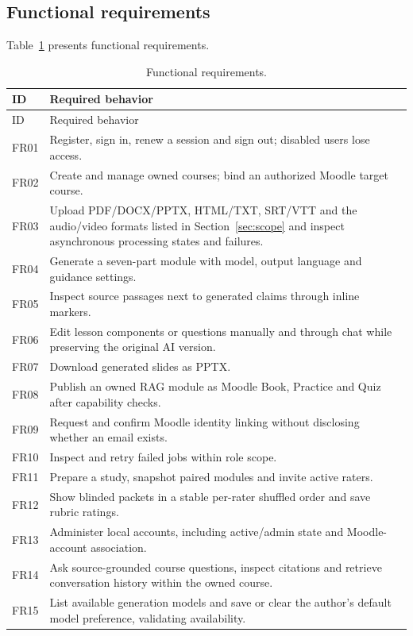 \subsection{Functional requirements}
\par
Table~\ref{tab:requirements} presents functional requirements.
\begin{longtable}{|p{1.5cm}|p{13.5cm}|}
\caption{Functional requirements.}\label{tab:requirements}\\\hline
ID & Required behavior\\\hline\endfirsthead
\hline ID & Required behavior\\\hline\endhead
FR01 & Register, sign in, renew a session and sign out; disabled users lose access.\\\hline
FR02 & Create and manage owned courses; bind an authorized Moodle target course.\\\hline
FR03 & Upload PDF/DOCX/PPTX, HTML/TXT, SRT/VTT and the audio/video formats listed in Section~\ref{sec:scope} and inspect asynchronous processing states and failures.\\\hline
FR04 & Generate a seven-part module with model, output language and guidance settings.\\\hline
FR05 & Inspect source passages next to generated claims through inline markers.\\\hline
FR06 & Edit lesson components or questions manually and through chat while preserving the original AI version.\\\hline
FR07 & Download generated slides as PPTX.\\\hline
FR08 & Publish an owned RAG module as Moodle Book, Practice and Quiz after capability checks.\\\hline
FR09 & Request and confirm Moodle identity linking without disclosing whether an email exists.\\\hline
FR10 & Inspect and retry failed jobs within role scope.\\\hline
FR11 & Prepare a study, snapshot paired modules and invite active raters.\\\hline
FR12 & Show blinded packets in a stable per-rater shuffled order and save rubric ratings.\\\hline
FR13 & Administer local accounts, including active/admin state and Moodle-account association.\\\hline
FR14 & Ask source-grounded course questions, inspect citations and retrieve conversation history within the owned course.\\\hline
FR15 & List available generation models and save or clear the author's default model preference, validating availability.\\\hline\end{longtable}
